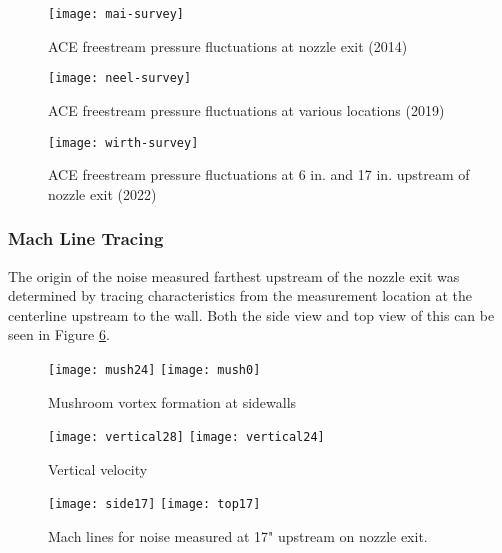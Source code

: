 \begin{figure}[ht!]
    \centering
    \texttt{[image: mai-survey]}
    \caption[ACE freestream pressure fluctuations at nozzle exit (2014)]{ACE freestream pressure fluctuations at nozzle exit (2014) \cite{mai-dis}}
    \label{fig:mai-survey}
\end{figure}

\begin{figure}[ht!]
    \centering
    \texttt{[image: neel-survey]}
    \caption[ACE freestream pressure fluctuations at various locations (2019)]{ACE freestream pressure fluctuations at various locations (2019) \cite{neel-dis}}
    \label{fig:neel-survey}
\end{figure}

\begin{figure}[ht!]
    \centering
    \texttt{[image: wirth-survey]}
    \caption{ACE freestream pressure fluctuations at 6 in. and 17 in. upstream of nozzle exit (2022)}
    \label{fig:wirth-survey}
\end{figure}


\subsubsection*{Mach Line Tracing}

The origin of the noise measured farthest upstream of the nozzle exit was determined by tracing characteristics from the measurement location at the centerline upstream to the wall. Both the side view and top view of this can be seen in Figure \ref{fig:machlines}.

\begin{figure}[ht!]
    \centering
    \texttt{[image: mush24]}
    \texttt{[image: mush0]}
    \caption{Mushroom vortex formation at sidewalls}
    \label{fig:mushrooms}
\end{figure}

\begin{figure}[ht!]
    \centering
    \texttt{[image: vertical28]}
    \texttt{[image: vertical24]}
    \caption{Vertical velocity}
    \label{fig:vertical-vel}
\end{figure}

\begin{figure}[ht!]
    \centering
    \texttt{[image: side17]}
    \texttt{[image: top17]}
    \caption{Mach lines for noise measured at 17" upstream on nozzle exit.}
    \label{fig:machlines}
\end{figure}

